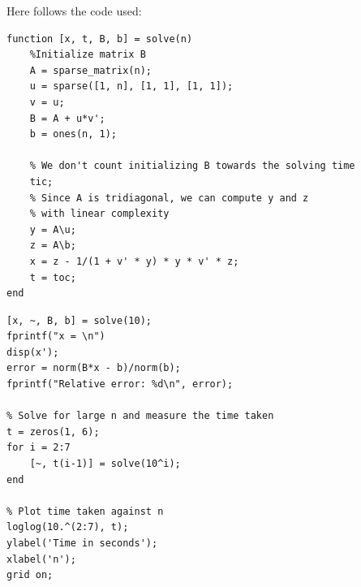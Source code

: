 \documentclass{article}
\begin{document}
Here follows the code used:
\begin{Verbatim}[frame=single,
	label=\textsc{Matlab} code - solve.m]
function [x, t, B, b] = solve(n)
    %Initialize matrix B
    A = sparse_matrix(n);
    u = sparse([1, n], [1, 1], [1, 1]);
    v = u;
    B = A + u*v';
    b = ones(n, 1);

    % We don't count initializing B towards the solving time
    tic;
    % Since A is tridiagonal, we can compute y and z
    % with linear complexity
    y = A\u;
    z = A\b;
    x = z - 1/(1 + v' * y) * y * v' * z;
    t = toc;
end
\end{Verbatim}

\begin{Verbatim}[frame=single,
	label=\textsc{Matlab} code - main.m]
% Solve for n=10 and display the relative error
[x, ~, B, b] = solve(10);
fprintf("x = \n")
disp(x');
error = norm(B*x - b)/norm(b);
fprintf("Relative error: %d\n", error);

% Solve for large n and measure the time taken
t = zeros(1, 6);
for i = 2:7
	[~, t(i-1)] = solve(10^i);
end

% Plot time taken against n
loglog(10.^(2:7), t);
ylabel('Time in seconds');
xlabel('n');
grid on;

\end{Verbatim}
\end{document}
